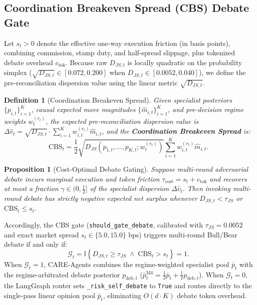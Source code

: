 \documentclass[10pt,a4paper,twocolumn]{article}
\newtheorem{proposition}{Proposition}
\newtheorem{definition}{Definition}
\begin{document}
\subsection{Coordination Breakeven Spread (CBS) Debate Gate}

Let $s_t > 0$ denote the effective one-way execution friction (in basis points), combining commission, stamp duty, and half-spread slippage, plus tokenized debate overhead $c_{\text{tok}}$. Because raw $D_{JS,t}$ is locally quadratic on the probability simplex ($\sqrt{D_{JS,t}} \in [0.072, 0.200]$ when $D_{JS,t} \in [0.0052, 0.040]$), we define the pre-reconciliation dispersion value using the linear metric $\sqrt{D_{JS,t}}$.

\begin{definition}[Coordination Breakeven Spread]
Given specialist posteriors $\{p_{i,t}\}_{i=1}^K$, causal expected move magnitudes $\{\hat{m}_{i,t}\}_{i=1}^K$, and pre-decision regime weights $w_t^{(r_t)}$, the expected pre-reconciliation dispersion value is $\Delta \hat{v}_t = \sqrt{D_{JS,t}} \cdot \sum_{i=1}^K w_{i,t}^{(r_t)} \hat{m}_{i,t}$, and the \textbf{Coordination Breakeven Spread} is:
\begin{equation}
  \text{CBS}_t = \frac{1}{2} \sqrt{D_{JS}\!\left(p_{1,t}, \dots, p_{K,t}; w_t^{(r_t)}\right)} \sum_{i=1}^K w_{i,t}^{(r_t)} \hat{m}_{i,t}.
  \label{eq:cbs}
\end{equation}
\end{definition}

\begin{proposition}[Cost-Optimal Debate Gating]
Suppose multi-round adversarial debate incurs marginal execution and token friction $\tau_{\text{cost}} = s_t + c_{\text{tok}}$ and recovers at most a fraction $\gamma \in (0, \frac{1}{2}]$ of the specialist dispersion $\Delta \hat{v}_t$. Then invoking multi-round debate has strictly negative expected net surplus whenever $D_{JS,t} < \tau_{JS}$ or $\text{CBS}_t \le s_t$.
\end{proposition}

Accordingly, the CBS gate (\texttt{should\_gate\_debate}, calibrated with $\tau_{JS} = 0.0052$ and exact market spread $s_t \in \{5.0, 15.0\}\text{ bps}$) triggers multi-round Bull/Bear debate if and only if:
\begin{equation}
  \mathcal{G}_t = \mathbb{I}\!\left\{ D_{JS,t} \ge \tau_{JS} \;\wedge\; \text{CBS}_t > s_t \right\} = 1.
  \label{eq:gate}
\end{equation}
When $\mathcal{G}_t = 1$, CARE-Agents combines the regime-weighted specialist pool $\bar{p}_t$ with the regime-arbitrated debate posterior $p_{\text{deb},t}$ ($\bar{p}_t^{\text{M4}} = \frac{1}{2}\bar{p}_t + \frac{1}{2}p_{\text{deb},t}$). When $\mathcal{G}_t = 0$, the LangGraph router sets \texttt{\_risk\_self\_debate} to \texttt{True} and routes directly to the single-pass linear opinion pool $\bar{p}_t$, eliminating $O(d \cdot K)$ debate token overhead.
\end{document}
